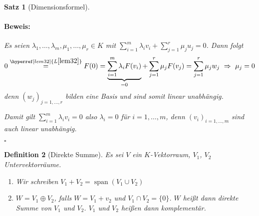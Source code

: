 \documentclass{report}
\newcommand{\lb}{\lambda}
\DeclareMathOperator{\Span}{span}
\theoremstyle{customrem}
\theoremstyle{customdef}
\newtheorem{definition}{Definition}[chapter]
\newtheorem{satz}[definition]{Satz}
\renewenvironment{proof}{\vspace{-.75cm}\paragraph{Beweis: }}{\vspace{-.5cm}\hfill$\square$}
\begin{document}
\begin{satz}[Dimensionsformel]
\begin{proof}
\begin{enumerate}
				Es seien $\lb_1,\ldots, \lb_m, \mu_1, \ldots, \mu_r\in K$ mit $\sum_{i=1}^{m}\lb_i v_i + \sum_{j=1}^{r}\mu_j u_j=0$. Dann folgt $$0\stackrel{\hyperref[lem32]{L\ref{lem32}}}{=} F(0) = \underbrace{\sum_{i=1}^{m}\lb_i F(v_i)}_{=0} + \sum_{j=1}^{r}\mu_jF(v_j) = \sum_{j=1}^{r}\mu_jw_j\ \Rightarrow \ \mu_j = 0$$ denn $(w_j)_{j=1,\ldots, r}$ bilden eine Basis und sind somit linear unabhängig.
				
				Damit gilt $\sum_{i=1}^{m}\lb_iv_i=0$ also $\lb_i=0$ für $i=1, \ldots, m$, denn $(v_i)_{i=1, \ldots, m}$ sind auch linear unabhängig.\\
			\end{enumerate}
		\end{proof}
	\end{satz}
	\begin{definition}[Direkte Summe]
		Es sei $V$ ein $K$-Vektorraum, $V_1$, $V_2$ Untervektorräume.
		\begin{enumerate}
			\item Wir schreiben $V_1+V_2=\Span(V_1\cup V_2)$
			\item $W=V_1\oplus V_2$, falls $W=V_1+v_2$ und $V_1\cap V_2 = \{0\}$. $W$ heißt dann direkte Summe von $V_1$ und $V_2$. $V_1$ und $V_2$ heißen dann komplementär.
		\end{enumerate}
	\end{definition}
\newpage
\printindex
\end{document}
